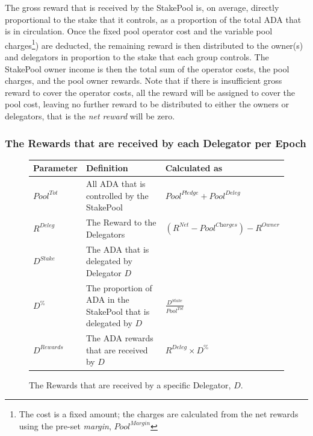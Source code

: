 \documentclass[11pt,a4paper,dvipsnames,twosided,final]{article}
\newcommand{\ada}{ADA{}}
\begin{document}
\noindent
The gross reward that is received by the StakePool is, on average, directly proportional to the
stake that it controls, as a proportion of the total \ada{} that is in circulation.
Once the fixed pool operator cost and the variable pool charges\footnote{The cost is a fixed amount; the charges are calculated from the net rewards using the pre-set \emph{margin}, $\textit{Pool}^{\textit{Margin}}$}) are deducted,
the remaining reward is then distributed to the owner(s) and delegators in proportion to the
stake that each group controls.  The StakePool owner income is then the total sum of the operator costs, the pool charges,
and the pool owner rewards.
Note that if there is insufficient gross reward to cover the operator costs, all the reward will be assigned to cover the
pool cost, leaving no further reward to be distributed to either the owners or delegators, that is the \emph{net reward} will be zero.


\subsubsection*{The Rewards that are received by each Delegator per Epoch}

\begin{figure}[h!]
\begin{center}
\begin{tabular}{||l|p{9cm}|l||}
  \hline \hline
\textbf{Parameter} & \textbf{Definition} & \textbf{Calculated as} \\\hline
${\textit{Pool}}^{Tot}$ & All \ada{} that is controlled by the StakePool & ${\textit{Pool}}^\textit{Pledge} + {\textit{Pool}}^\textit{Deleg}$ \\\hline
$R^{Deleg}$ & The Reward to the Delegators & $(R^{\textit{Net}}-\textit{Pool}^{\textit{Charges}}) - R^{Owner}$ \\\hline
$D^{Stake}$ & The \ada{} that is delegated by Delegator $D$ & \\\hline
$D^\%$ & The proportion of \ada{} in the StakePool that is delegated by $D$ & $\frac{D^{Stake}}{Pool^{Tot}}$ \\\hline
$D^{Rewards}$ & The \ada{} rewards that are received by $D$ & $R^{\textit{Deleg}} \times D^\%$ \\\hline
\hline
\end{tabular}
\end{center}
\caption{The Rewards that are received by a specific Delegator, $D$.}
\end{figure}
\end{document}
